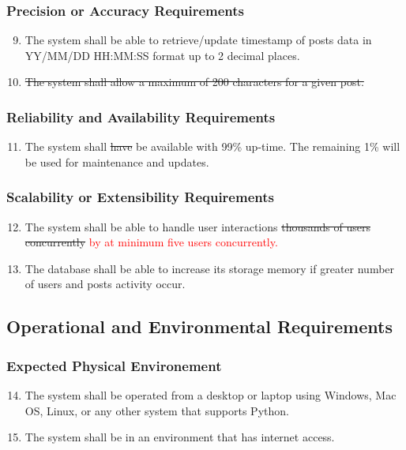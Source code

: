 \documentclass[12pt, titlepage]{article}
\begin{document}
\subsubsection{Precision or Accuracy Requirements}
    \begin{enumerate}
    \setcounter{enumi}{8}
        \item The system shall be able to retrieve/update timestamp of posts data in YY/MM/DD HH:MM:SS format up to 2 decimal places.
        \item \sout{The system shall allow a maximum of 200 characters for a given post.}
    \end{enumerate}
\subsubsection{Reliability and Availability Requirements}
    \begin{enumerate}
    \setcounter{enumi}{10}
        \item The system shall \sout{have} be available with 99\% up-time. The remaining 1\% will be used for maintenance and updates.
    \end{enumerate}
\subsubsection{Scalability or Extensibility Requirements}
    \begin{enumerate}
    \setcounter{enumi}{11}
        \item The system shall be able to handle user interactions \sout{thousands of users concurrently} \textcolor{red}{by at minimum five users concurrently.}
        \item The database shall be able to increase its storage memory if greater number of users and posts activity occur.
    \end{enumerate}

\subsection{Operational and Environmental Requirements}
\subsubsection{Expected Physical Environement}
    \begin{enumerate}
    \setcounter{enumi}{13}
        \item The system shall be operated from a desktop or laptop using Windows, Mac OS, Linux, or any other system that supports Python.
        \item The system shall be in an environment that has internet access.
    \end{enumerate}
\end{document}
